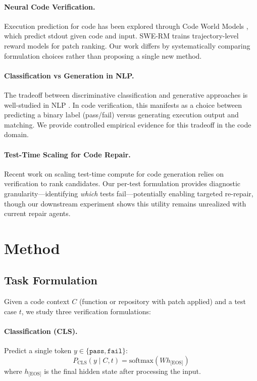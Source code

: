 \documentclass[11pt,a4paper]{article}
\begin{document}
\paragraph{Neural Code Verification.}
Execution prediction for code has been explored through Code World Models \cite{gu2024cruxeval}, which predict stdout given code and input. SWE-RM \cite{zhang2025swerm} trains trajectory-level reward models for patch ranking. Our work differs by systematically comparing formulation choices rather than proposing a single new method.

\paragraph{Classification vs Generation in NLP.}
The tradeoff between discriminative classification and generative approaches is well-studied in NLP \cite{ng2001discriminative}. In code verification, this manifests as a choice between predicting a binary label (pass/fail) versus generating execution output and matching. We provide controlled empirical evidence for this tradeoff in the code domain.

\paragraph{Test-Time Scaling for Code Repair.}
Recent work on scaling test-time compute for code generation \cite{chen2024codegen} relies on verification to rank candidates. Our per-test formulation provides diagnostic granularity---identifying \emph{which} tests fail---potentially enabling targeted re-repair, though our downstream experiment shows this utility remains unrealized with current repair agents.

\section{Method}

\subsection{Task Formulation}

Given a code context $C$ (function or repository with patch applied) and a test case $t$, we study three verification formulations:

\paragraph{Classification (CLS).} Predict a single token $y \in \{\texttt{pass}, \texttt{fail}\}$:
$$P_\text{CLS}(y \mid C, t) = \text{softmax}(W h_\text{[EOS]})$$
where $h_\text{[EOS]}$ is the final hidden state after processing the input.
\end{document}
